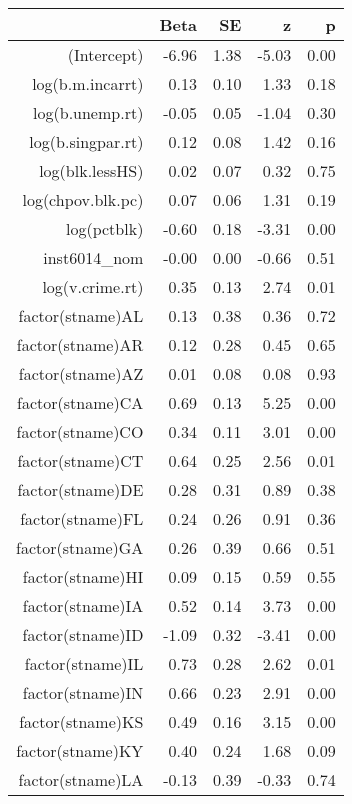\begin{table}[ht]
\centering
\begin{tabular}{rrrrr}
  \hline
 & Beta & SE & z & p \\ 
  \hline
(Intercept) & -6.96 & 1.38 & -5.03 & 0.00 \\ 
  log(b.m.incarrt) & 0.13 & 0.10 & 1.33 & 0.18 \\ 
  log(b.unemp.rt) & -0.05 & 0.05 & -1.04 & 0.30 \\ 
  log(b.singpar.rt) & 0.12 & 0.08 & 1.42 & 0.16 \\ 
  log(blk.lessHS) & 0.02 & 0.07 & 0.32 & 0.75 \\ 
  log(chpov.blk.pc) & 0.07 & 0.06 & 1.31 & 0.19 \\ 
  log(pctblk) & -0.60 & 0.18 & -3.31 & 0.00 \\ 
  inst6014\_nom & -0.00 & 0.00 & -0.66 & 0.51 \\ 
  log(v.crime.rt) & 0.35 & 0.13 & 2.74 & 0.01 \\ 
  factor(stname)AL & 0.13 & 0.38 & 0.36 & 0.72 \\ 
  factor(stname)AR & 0.12 & 0.28 & 0.45 & 0.65 \\ 
  factor(stname)AZ & 0.01 & 0.08 & 0.08 & 0.93 \\ 
  factor(stname)CA & 0.69 & 0.13 & 5.25 & 0.00 \\ 
  factor(stname)CO & 0.34 & 0.11 & 3.01 & 0.00 \\ 
  factor(stname)CT & 0.64 & 0.25 & 2.56 & 0.01 \\ 
  factor(stname)DE & 0.28 & 0.31 & 0.89 & 0.38 \\ 
  factor(stname)FL & 0.24 & 0.26 & 0.91 & 0.36 \\ 
  factor(stname)GA & 0.26 & 0.39 & 0.66 & 0.51 \\ 
  factor(stname)HI & 0.09 & 0.15 & 0.59 & 0.55 \\ 
  factor(stname)IA & 0.52 & 0.14 & 3.73 & 0.00 \\ 
  factor(stname)ID & -1.09 & 0.32 & -3.41 & 0.00 \\ 
  factor(stname)IL & 0.73 & 0.28 & 2.62 & 0.01 \\ 
  factor(stname)IN & 0.66 & 0.23 & 2.91 & 0.00 \\ 
  factor(stname)KS & 0.49 & 0.16 & 3.15 & 0.00 \\ 
  factor(stname)KY & 0.40 & 0.24 & 1.68 & 0.09 \\ 
  factor(stname)LA & -0.13 & 0.39 & -0.33 & 0.74 \\ 

\end{tabular}
\end{table}
